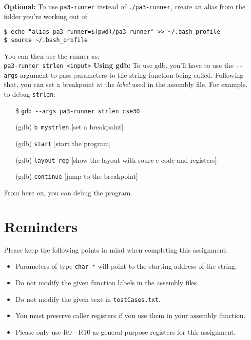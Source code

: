 \documentclass{article}
\begin{document}
\textbf{Optional:}
To use \texttt{pa3-runner} instead of \texttt{./pa3-runner}, create an alias from the folder you're working out of:
\begin{verbatim}
$ echo "alias pa3-runner=$(pwd)/pa3-runner" >> ~/.bash_profile
$ source ~/.bash_profile
\end{verbatim}
You can then use the runner as:\\
\texttt{pa3-runner strlen <input>}
\textbf{Using gdb:}
To use gdb, you'll have to use the \texttt{-{}-args} argument to pass parameters to the string function being called. Following that, you can set a breakpoint at the \textit{label} used in the assembly file. For example, to debug \texttt{strlen}:
\begin{itemize}
\item[\$]\texttt{gdb -{}-args pa3-runner strlen cse30}
\item[(gdb)]\texttt{b mystrlen} \hspace{10mm} [set a breakpoint]
\item[(gdb)]\texttt{start}  \hspace{19mm}   [start the program]
\item[(gdb)]\texttt{layout reg} \hspace{10mm} [show the layout with sourc e code and registers]
\item[(gdb)]\texttt{continue} \hspace{14mm}  [jump to the breakpoint]
\end{itemize}
From here on, you can debug the program.
\section{Reminders}
Please keep the following points in mind when completing this assignment:
\begin{itemize}
    \item Parameters of type {\tt char *} will point to the starting address of the string.
    \item Do not modify the given function labels in the assembly files.
    \item Do not modify the given text in {\tt testCases.txt}.
    \item You must preserve caller registers if you use them in your assembly function.
    \item Please only use R0 - R10 as general-purpose registers for this assignment.
    
\end{itemize}
\end{document}
